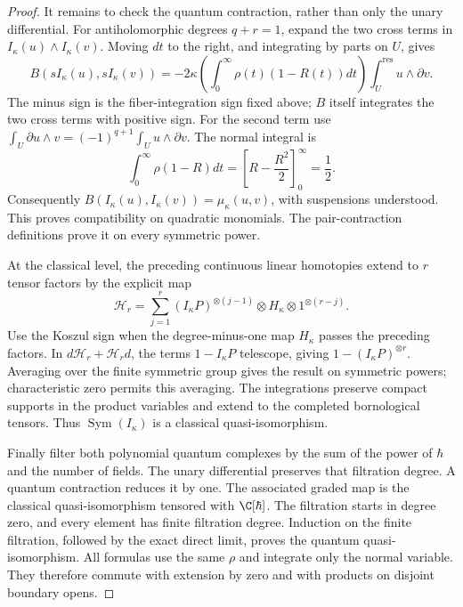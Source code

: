 \begin{proof}
It remains to check the quantum contraction, rather than only the
unary differential.  For antiholomorphic degrees $q+r=1$, expand the
two cross terms in $I_\kappa(u)\wedge I_\kappa(v)$.
Moving $dt$ to the right, and integrating by parts on $U$, gives
\[
 B(sI_\kappa(u),sI_\kappa(v))
 =-2\kappa\left(\int_0^\infty\rho(t)(1-R(t))dt\right)
                          \int_U^{\mathrm{res}}u\wedge\partial v.
\]
The minus sign is the fiber-integration sign fixed above;
$B$ itself integrates the two cross terms with positive sign.
For the second term use
$\int_U\partial u\wedge v=(-1)^{q+1}\int_Uu\wedge\partial v$.
The normal integral is
\[
 \int_0^\infty\rho(1-R)dt
  =\left[R-\frac{R^2}{2}\right]_0^\infty=\frac12.
\]
Consequently $B(I_\kappa(u),I_\kappa(v))=\mu_\kappa(u,v)$, with
suspensions understood.  This proves compatibility on quadratic
monomials.  The pair-contraction definitions prove it on every
symmetric power.

At the classical level, the preceding continuous linear homotopies
extend to $r$ tensor factors by the explicit map
\[
 \mathscr H_r=\sum_{j=1}^r
 (I_\kappa P)^{\otimes(j-1)}\otimes H_\kappa
                       \otimes1^{\otimes(r-j)}.
\]
Use the Koszul sign when the degree-minus-one map $H_\kappa$ passes
the preceding factors.  In $d\mathscr H_r+\mathscr H_rd$, the terms
$1-I_\kappa P$ telescope, giving $1-(I_\kappa P)^{\otimes r}$.
Averaging
over the finite symmetric group gives the result on symmetric powers;
characteristic zero permits this averaging.  The integrations preserve
compact supports in the product variables and extend to the completed
bornological tensors.  Thus $\operatorname{Sym}(I_\kappa)$ is a
classical quasi-isomorphism.

Finally filter both polynomial quantum complexes by the sum of the
power of $\hbar$ and the number of fields.  The unary differential
preserves that filtration degree.  A quantum contraction reduces it
by one.  The associated graded map is the classical
quasi-isomorphism tensored with $\C[\hbar]$.  The filtration starts
in degree zero, and every element has finite filtration degree.
Induction on the finite filtration, followed by the exact direct
limit, proves the quantum quasi-isomorphism.
All formulas use the same $\rho$ and integrate only the normal
variable.  They therefore commute with extension by zero and with
products on disjoint boundary opens.
\end{proof}

